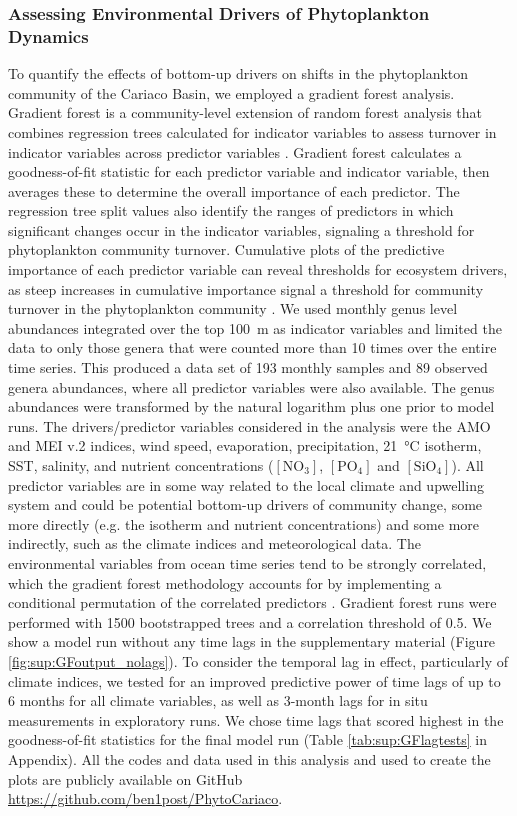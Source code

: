 \documentclass[draft]{agujournal2019}
\begin{document}
        
    \subsubsection{Assessing Environmental Drivers of Phytoplankton Dynamics}
    To quantify the effects of bottom-up drivers on shifts in the phytoplankton community of the Cariaco Basin, we employed a gradient forest analysis. Gradient forest is a community-level extension of random forest analysis that combines regression trees calculated for indicator variables to assess turnover in indicator variables across predictor variables \cite{pitcher_example_2012, large_critical_2015, tam_comparing_2017}. Gradient forest calculates a goodness-of-fit statistic for each predictor variable and indicator variable, then averages these to determine the overall importance of each predictor. The regression tree split values also identify the ranges of predictors in which significant changes occur in the indicator variables, signaling a threshold for phytoplankton community turnover. Cumulative plots of the predictive importance of each predictor variable can reveal thresholds for ecosystem drivers, as steep increases in cumulative importance signal a threshold for community turnover in the phytoplankton community \cite{tam_comparing_2017}. We used monthly genus level abundances integrated over the top \qty{100}{\meter} as indicator variables and limited the data to only those genera that were counted more than 10 times over the entire time series. This produced a data set of 193 monthly samples and 89 observed genera abundances, where all predictor variables were also available. The genus abundances were transformed by the natural logarithm plus one prior to model runs. The drivers/predictor variables considered in the analysis were the AMO and MEI v.2 indices, wind speed, evaporation, precipitation, \qty{21}{\celsius} isotherm, SST, salinity, and nutrient concentrations ($\mathrm{[NO_3]}$, $\mathrm{[PO_4]}$ and $\mathrm{[SiO_4]}$). All predictor variables are in some way related to the local climate and upwelling system and could be potential bottom-up drivers of community change, some more directly (e.g. the isotherm and nutrient concentrations) and some more indirectly, such as the climate indices and meteorological data. 
    The environmental variables from ocean time series tend to be strongly correlated, which the gradient forest methodology accounts for by implementing a conditional permutation of the correlated predictors \cite{ellis_gradient_2012}. Gradient forest runs were performed with 1500 bootstrapped trees and a correlation threshold of 0.5.
    We show a model run without any time lags in the supplementary material (Figure \ref{fig:sup:GFoutput_nolags}). To consider the temporal lag in effect, particularly of climate indices, we tested for an improved predictive power of time lags of up to 6 months for all climate variables, as well as 3-month lags for in situ measurements in exploratory runs. We chose time lags that scored highest in the goodness-of-fit statistics for the final model run (Table \ref{tab:sup:GFlagtests} in Appendix). All the codes and data used in this analysis and used to create the plots are publicly available on GitHub \url{https://github.com/ben1post/PhytoCariaco}.
\end{document}
